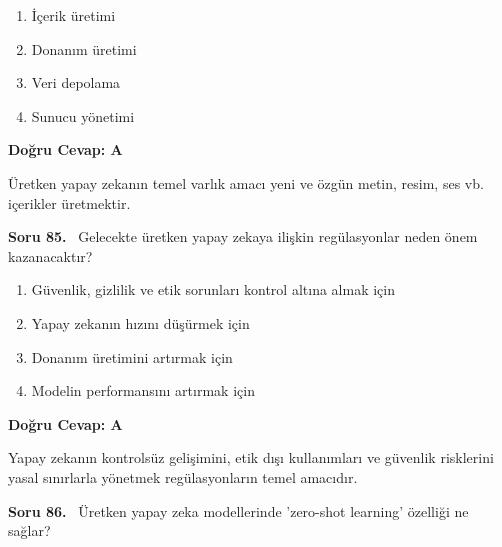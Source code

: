\documentclass[11pt,a4paper,openany]{book}
\begin{document}
\begin{enumerate}[label=\Alph*), leftmargin=25pt, topsep=4pt, itemsep=2pt]
        \item İçerik üretimi
        \item Donanım üretimi
        \item Veri depolama
        \item Sunucu yönetimi
\end{enumerate}

\vspace{4pt}
\begin{tcolorbox}[title=Cevap ve Açıklama, colback=gray!3!white, colframe=primarycolor!90!black, arc=2mm, fonttitle=\bfseries\sffamily, top=6pt, bottom=6pt]
    \textbf{Doğru Cevap: A}
    
    \vspace{2pt}
    Üretken yapay zekanın temel varlık amacı yeni ve özgün metin, resim, ses vb. içerikler üretmektir.
\end{tcolorbox}
\vspace{10pt}
\needspace{5cm}
\vspace{8pt}
\noindent\textbf{\large\sffamily Soru 85.} \ Gelecekte üretken yapay zekaya ilişkin regülasyonlar neden önem kazanacaktır?

\begin{enumerate}[label=\Alph*), leftmargin=25pt, topsep=4pt, itemsep=2pt]
        \item Güvenlik, gizlilik ve etik sorunları kontrol altına almak için
        \item Yapay zekanın hızını düşürmek için
        \item Donanım üretimini artırmak için
        \item Modelin performansını artırmak için
\end{enumerate}

\vspace{4pt}
\begin{tcolorbox}[title=Cevap ve Açıklama, colback=gray!3!white, colframe=primarycolor!90!black, arc=2mm, fonttitle=\bfseries\sffamily, top=6pt, bottom=6pt]
    \textbf{Doğru Cevap: A}
    
    \vspace{2pt}
    Yapay zekanın kontrolsüz gelişimini, etik dışı kullanımları ve güvenlik risklerini yasal sınırlarla yönetmek regülasyonların temel amacıdır.
\end{tcolorbox}
\vspace{10pt}
\needspace{5cm}
\vspace{8pt}
\noindent\textbf{\large\sffamily Soru 86.} \ Üretken yapay zeka modellerinde 'zero-shot learning' özelliği ne sağlar?
\end{document}
